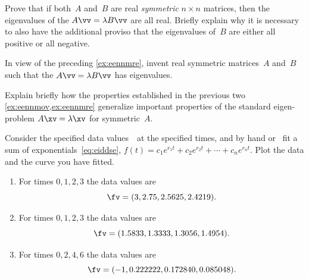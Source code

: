 \begin{reduce}
\begin{exercise} \label{ex:eennmre} 
Prove that if both~\(A\) and~\(B\) are real \emph{symmetric} \(n\times n\) matrices, then the eigenvalues of the  \(A\vv=\lambda B\vv\) are all real.
Briefly explain why it is necessary to also have the additional proviso that the eigenvalues of~\(B\) are either all positive or all negative.
\end{exercise}


\begin{exercise}  
In view of the preceding \autoref{ex:eennmre},
invent real symmetric matrices~\(A\) and~\(B\) such that the  \(A\vv=\lambda B\vv\) has  eigenvalues.
\end{exercise}



\begin{exercise}  
Explain briefly how the properties established in the previous two 
\cref{ex:eennmov,ex:eennmre} generalize important properties of the standard eigen-problem \(A\xv=\lambda\xv\) for symmetric~\(A\).
\end{exercise}






\begin{exercise} 
Consider the specified data values~\fv\ at the specified times, and by hand or \script\ fit a sum of exponentials~\eqref{eq:eiddse}, \(f(t)=c_1e^{r_1t}+c_2e^{r_2t}+\cdots+c_ne^{r_nt}\).
Plot the data and the curve you have fitted.
\begin{enumerate}
\item For times \(0,1,2,3\) the data values are \[\fv=(3, 2.75, 2.5625, 2.4219).\]

\item For times \(0,1,2,3\) the data values are \[\fv=(1.5833, 1.3333, 1.3056, 1.4954).\]

\item For times \(0,2,4,6\) the data values are \[\fv=(-1, 0.222222, 0.172840, 0.085048).\]


\end{enumerate}
\end{exercise}
\end{reduce}
